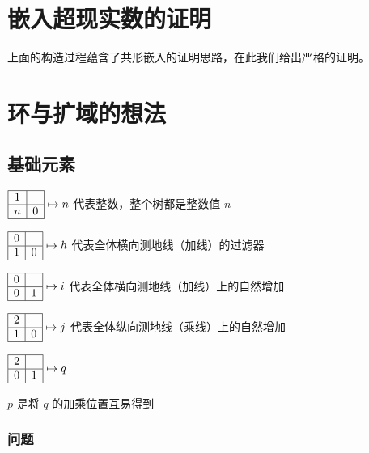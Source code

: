 \documentclass[a4paper,12pt]{article}
\begin{document}
\newpage

\section{嵌入超现实数的证明}

上面的构造过程蕴含了共形嵌入的证明思路，在此我们给出严格的证明。

\newpage

\section{环与扩域的想法}

\subsection{基础元素}

$\begin{array}{|c|c|}\hline 1&\space\\\hline n&0\\\hline\end{array} \mapsto n$ 代表整数，整个树都是整数值 $n$

$\begin{array}{|c|c|}\hline0&\space\\\hline 1&0\\\hline\end{array} \mapsto h$ 代表全体横向测地线（加线）的过滤器

$\begin{array}{|c|c|}\hline0&\space\\\hline 0&1\\\hline\end{array} \mapsto i$ 代表全体横向测地线（加线）上的自然增加

$\begin{array}{|c|c|}\hline2&\space\\\hline 1&0\\\hline\end{array} \mapsto j$ 代表全体纵向测地线（乘线）上的自然增加

$\begin{array}{|c|c|}\hline2&\space\\\hline 0&1\\\hline\end{array} \mapsto q$

$p$ 是将 $q$ 的加乘位置互易得到

\subsubsection{问题}
\end{document}
